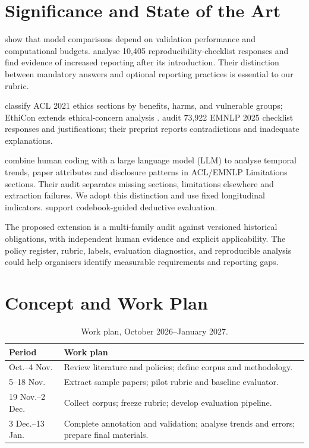 \documentclass[11pt]{article}
\begin{document}
\section{Significance and State of the Art}
\label{sec:sota}
 show that model comparisons depend on validation performance and computational budgets.  analyse 10,405 reproducibility-checklist responses and find evidence of increased reporting after its introduction. Their distinction between mandatory answers and optional reporting practices is essential to our rubric.

 classify ACL 2021 ethics sections by benefits, harms, and vulnerable groups; EthiCon extends ethical-concern analysis \cite{karamolegkou2025ethical}.  audit 73,922 EMNLP 2025 checklist responses and justifications; their preprint reports contradictions and inadequate explanations.

 combine human coding with a large language model (LLM) to analyse temporal trends, paper attributes and disclosure patterns in ACL/EMNLP Limitations sections. Their audit separates missing sections, limitations elsewhere and extraction failures. We adopt this distinction and use fixed longitudinal indicators.  support codebook-guided deductive evaluation.

The proposed extension is a multi-family audit against versioned historical obligations, with independent human evidence and explicit applicability. The policy register, rubric, labels, evaluation diagnostics, and reproducible analysis could help organisers identify measurable requirements and reporting gaps.

\section{Concept and Work Plan}
\label{sec:plan}
\begin{table}[t]
\centering\small
\begin{tabularx}{\columnwidth}{@{}p{}X@{}}
\toprule
Period & Work plan \\
\midrule
Oct.--4 Nov. & Review literature and policies; define corpus and methodology. \\
5--18 Nov. & Extract sample papers; pilot rubric and baseline evaluator. \\
19 Nov.--2 Dec. & Collect corpus; freeze rubric; develop evaluation pipeline. \\
3 Dec.--13 Jan. & Complete annotation and validation; analyse trends and errors; prepare final materials. \\
\bottomrule
\end{tabularx}
\caption{Work plan, October 2026--January 2027.}
\label{tab:timeline}
\end{table}
\end{document}
